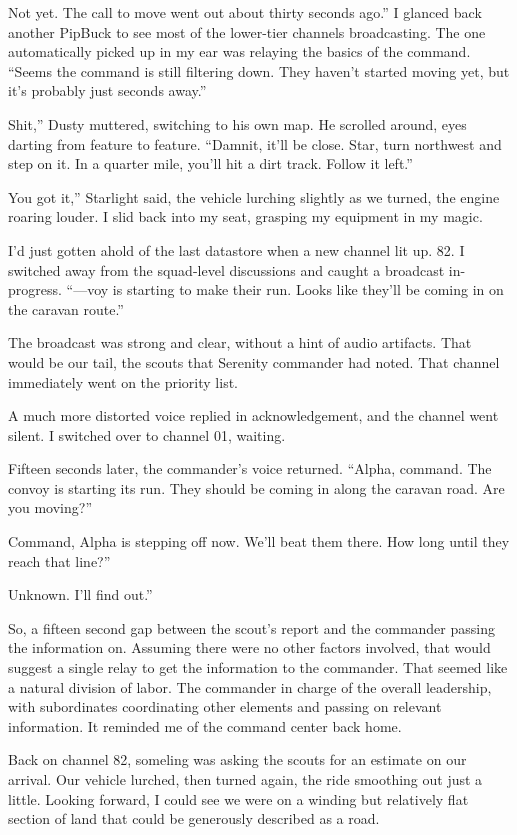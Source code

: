 \leavevmode{}Not yet. The call to move went out about thirty seconds ago.” I glanced back another PipBuck to see most of the lower-tier channels broadcasting. The one automatically picked up in my ear was relaying the basics of the command. “Seems the command is still filtering down. They haven’t started moving yet, but it’s probably just seconds away.”

\leavevmode{}Shit,” Dusty muttered, switching to his own map. He scrolled around, eyes darting from feature to feature. “Damnit, it’ll be close. Star, turn northwest and step on it. In a quarter mile, you’ll hit a dirt track. Follow it left.”

\leavevmode{}You got it,” Starlight said, the vehicle lurching slightly as we turned, the engine roaring louder. I slid back into my seat, grasping my equipment in my magic.

I’d just gotten ahold of the last datastore when a new channel lit up. 82. I switched away from the squad-level discussions and caught a broadcast in-progress. “—voy is starting to make their run. Looks like they’ll be coming in on the caravan route.”

The broadcast was strong and clear, without a hint of audio artifacts. That would be our tail, the scouts that Serenity commander had noted. That channel immediately went on the priority list.

A much more distorted voice replied in acknowledgement, and the channel went silent. I switched over to channel 01, waiting.

Fifteen seconds later, the commander’s voice returned. “Alpha, command. The convoy is starting its run. They should be coming in along the caravan road. Are you moving?”

\leavevmode{}Command, Alpha is stepping off now. We’ll beat them there. How long until they reach that line?”

\leavevmode{}Unknown. I’ll find out.”

So, a fifteen second gap between the scout’s report and the commander passing the information on. Assuming there were no other factors involved, that would suggest a single relay to get the information to the commander. That seemed like a natural division of labor. The commander in charge of the overall leadership, with subordinates coordinating other elements and passing on relevant information. It reminded me of the command center back home.

Back on channel 82, someling was asking the scouts for an estimate on our arrival. Our vehicle lurched, then turned again, the ride smoothing out just a little. Looking forward, I could see we were on a winding but relatively flat section of land that could be generously described as a road.

